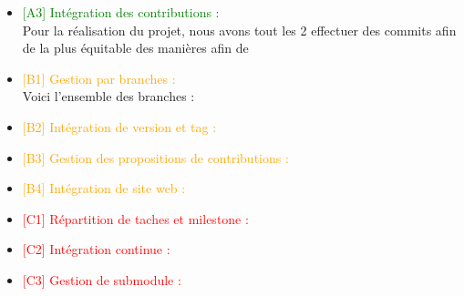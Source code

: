 \begin{itemize}
    \item \textcolor{green}{[A3] Intégration des contributions : }
    \\ Pour la réalisation du projet, nous avons tout les 2 effectuer des commits afin de la plus équitable des manières afin de 
    \item \textcolor{orange}{[B1] Gestion par branches : }
    \\ Voici l'ensemble des branches : \\ 
    \item \textcolor{orange}{[B2] Intégration de version et tag : }
    \item \textcolor{orange}{[B3] Gestion des propositions de contributions : }
    \item \textcolor{orange}{[B4] Intégration de site web : }
    \item \textcolor{red}{[C1] Répartition de taches et milestone : }
    \item \textcolor{red}{[C2] Intégration continue : }
    \item \textcolor{red}{[C3] Gestion de submodule : }
\end{itemize}